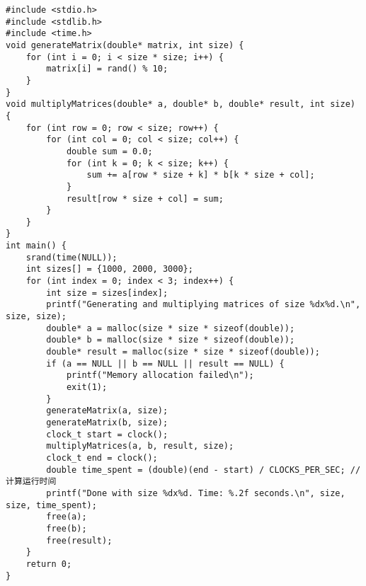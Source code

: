 \documentclass{article}
\begin{document}
\begin{lstlisting}[style=cstyle,caption={串行矩阵乘法}]
#include <stdio.h>
#include <stdlib.h>
#include <time.h>
void generateMatrix(double* matrix, int size) {
    for (int i = 0; i < size * size; i++) {
        matrix[i] = rand() % 10;
    }
}
void multiplyMatrices(double* a, double* b, double* result, int size) {
    for (int row = 0; row < size; row++) {
        for (int col = 0; col < size; col++) {
            double sum = 0.0;
            for (int k = 0; k < size; k++) {
                sum += a[row * size + k] * b[k * size + col];
            }
            result[row * size + col] = sum;
        }
    }
}
int main() {
    srand(time(NULL));
    int sizes[] = {1000, 2000, 3000};
    for (int index = 0; index < 3; index++) {
        int size = sizes[index];
        printf("Generating and multiplying matrices of size %dx%d.\n", size, size);
        double* a = malloc(size * size * sizeof(double));
        double* b = malloc(size * size * sizeof(double));
        double* result = malloc(size * size * sizeof(double));
        if (a == NULL || b == NULL || result == NULL) {
            printf("Memory allocation failed\n");
            exit(1);
        }
        generateMatrix(a, size);
        generateMatrix(b, size);
        clock_t start = clock();
        multiplyMatrices(a, b, result, size);
        clock_t end = clock();
        double time_spent = (double)(end - start) / CLOCKS_PER_SEC; // 计算运行时间
        printf("Done with size %dx%d. Time: %.2f seconds.\n", size, size, time_spent);
        free(a);
        free(b);
        free(result);
    }
    return 0;
}
\end{lstlisting}
\end{document}
